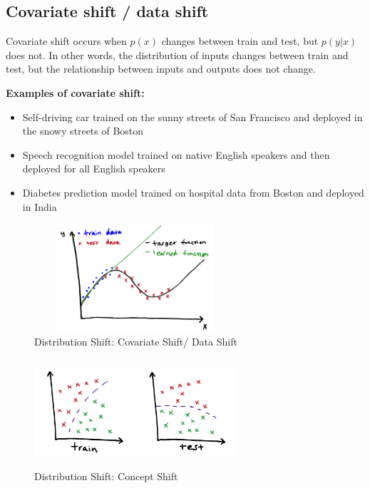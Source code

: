 \subsection{Covariate shift / data shift}\label{Covariate shift / data shift}
Covariate shift occurs when $p(x)$ changes between train and test, but $p(y|x)$ does not. In other words, the distribution of inputs changes between train and test, but the relationship between inputs and outputs does not change.

\vspace{0.2cm}
\textbf{Examples of covariate shift:}
\begin{itemize}
    \item Self-driving car trained on the sunny streets of San Francisco and deployed in the snowy streets of Boston
    \item Speech recognition model trained on native English speakers and then deployed for all English speakers
    \item Diabetes prediction model trained on hospital data from Boston and deployed in India
\end{itemize}

\begin{table}[H]
    \begin{minipage}{0.45\textwidth}
        \begin{figure}[H]
            \centering
            \includegraphics[width=7.5cm,height=4cm]{Pictures/ml-data/ml-data-covariate-shift.jpg}
            \caption{Distribution Shift: Covariate Shift/ Data Shift}
        \end{figure}
    \end{minipage}
    \hfill
    \begin{minipage}{0.45\textwidth}
        \begin{figure}[H]
            \centering
            \includegraphics[width=7.5cm,height=4cm]{Pictures/ml-data/ml-data-concept-shift.jpg}
            \caption{Distribution Shift: Concept Shift}
        \end{figure}
    \end{minipage}
\end{table}

